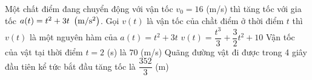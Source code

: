 \begin{ex}%

	Một chất điểm đang chuyển động với vận tốc $v_0=16$ (m/s) thì tăng tốc với gia tốc $a(t)=t^2+3t\,\,\left(\rm{m} / \rm{s}^2\right)$.
	\choiceTF
	{\True Gọi $v(t)$ là vận tốc của chầt điểm ở thời điểm $t$ thì $v(t)$ là một 	nguyên hàm của $a(t)=t^2+3t$}
	{$v(t)=\dfrac{t^3}{3}+\dfrac{3}{2} t^2+10$}
	{Vận tốc của vật tại thời điểm $t=2$ (s) là $70$ (m/s)}
	{\True Quãng đường vật đi được trong 4 giây đầu tiên kể tức bắt đầu tăng tốc là $\dfrac{352}{3}$ (m) }
\end{ex}

